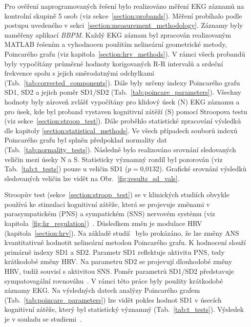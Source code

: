 Pro ověření naprogramovaných řešení bylo realizováno měření EKG záznamů na
kontrolní skupině 5 osob (viz sekce~\ref{section:probands}). Měření probíhalo
podle postupu uvedeného v sekci~\ref{section:measurement_methodology}. Záznamy
byly naměřeny aplikací \textit{BBPM}. Každý EKG záznam byl zpracován
realizovaným MATLAB řešením a vyhodnocen použitím nelineární
geometrické metody, Poincarého grafu (viz kapitola~\ref{section:hrv_methods}). V
rámci všech probandů byly vypočítány průměrné hodnoty korigovaných R-R intervalů
a srdeční frekvence spolu s jejich směrodatnými odchylkami
(Tab.~\ref{tab:corrected_components}). Dále byly určeny indexy Poincarého grafu
SD1, SD2 a jejich poměr SD1/SD2 (Tab.~\ref{tab:poincare_parameters}). Všechny hodnoty byly
zároveň zvlášť vypočítány pro klidový úsek (N) EKG záznamu a pro úsek, kde byl
proband vystaven kognitivní zátěží (S) pomocí Stroopova testu (viz
sekce~\ref{section:stroop_test}). Dále proběhlo statistické zpracování výsledků
dle kapitoly \ref{section:statistical_methods}. Ve všech případech souborů
indexů Poincarého grafu byl splněn předpoklad normality dat
(Tab.~\ref{tab:normality_tests}). Následně bylo realizováno srovnání sledovaných
veličin mezi úseky N a S. Statisticky významný rozdíl byl pozorován (viz
Tab.~\ref{tab:t_tests}) pouze u veličin SD1 ($p=$0,0132). Grafické srovnání
výsledků sledovaných veličin lze vidět na Obr.~\ref{fig:results_sd_vals}.

Stroopův test (sekce~\ref{section:stroop_test}) se v klinických studiích obvykle
používá ke stimulaci kognitivní zátěže, která se projevuje změnami v
parasympatickém (PNS) a sympatickém (SNS) nervovém systému (viz
kapitola~\ref{fig:hr_regulation})~\cite{Hoshikawa1997}. Důsledkem změn je
modulace HRV (kapitola~\ref{section:hrv}). Na základě
studií~\cite{Brennan2001,Kamen1996} bylo prokázáno, že lze změny ANS
kvantitativně hodnotit nelineární metodou Poincarého grafu. K hodnocení slouží
primárně indexy SD1 a SD2. Parametr SD1 reflektuje aktivitu PNS, tedy krátkodobé
změny HRV. Na parametru SD2 se projevují dlouhodobé změny HRV, tudíž souvisí s
aktivitou SNS. Poměr parametrů SD1/SD2 představuje sympatovagální
rovnováhu~\cite{Hsu2012,Habib2013,Mazhar2007}. V rámci této práce byly použity
krátkodobé záznamy EKG. Na výsledných datech analýzy Poincarého grafem
(Tab.~\ref{tab:poincare_parameters}) lze vidět pokles hodnot SD1 v úsecích
kognitivní zátěže, který byl statistický významný (Tab.~\ref{tab:t_tests}).
Výsledek je v souladu se
studiemi~\cite{Sebastiano2019,Brugnera2018,Vazan2017,Melillo2011}.




















